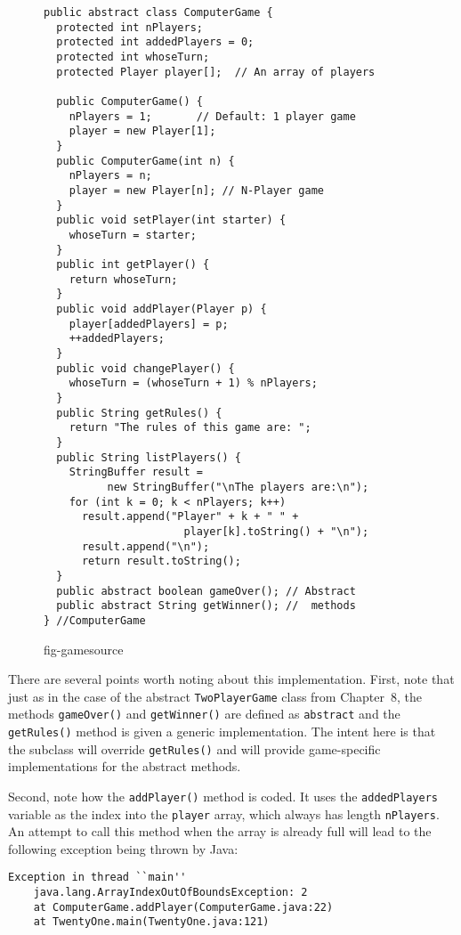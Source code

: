 \begin{figure}[h!]
\scriptsize
\jjjprogstart
\begin{jjjlisting}
\begin{lstlisting}
public abstract class ComputerGame {   
  protected int nPlayers;
  protected int addedPlayers = 0;
  protected int whoseTurn;
  protected Player player[];  // An array of players

  public ComputerGame() {
    nPlayers = 1;       // Default: 1 player game
    player = new Player[1];
  }
  public ComputerGame(int n) {
    nPlayers = n;
    player = new Player[n]; // N-Player game
  }
  public void setPlayer(int starter) { 
    whoseTurn = starter; 
  }
  public int getPlayer() { 
    return whoseTurn;  
  }
  public void addPlayer(Player p) {
    player[addedPlayers] = p;
    ++addedPlayers;
  }
  public void changePlayer() { 
    whoseTurn = (whoseTurn + 1) % nPlayers;
  }
  public String getRules() {
    return "The rules of this game are: ";
  }
  public String listPlayers() {
    StringBuffer result = 
          new StringBuffer("\nThe players are:\n");
    for (int k = 0; k < nPlayers; k++)
      result.append("Player" + k + " " + 
                      player[k].toString() + "\n");
      result.append("\n");
      return result.toString();
  }
  public abstract boolean gameOver(); // Abstract
  public abstract String getWinner(); //  methods
} //ComputerGame
\end{lstlisting}
\end{jjjlisting}
{fig-gamesource}
\end{figure}

\noindent There are several points worth noting about this
implementation. First, note that just as in the case of the abstract
{\tt TwoPlayerGame} class from Chapter~8, the methods {\tt gameOver()}
and {\tt getWinner()} are defined as {\tt abstract} and the {\tt
getRules()} method is given a generic implementation. The intent here
is that the subclass will override {\tt getRules()} and will provide
game-specific implementations for the abstract methods.

Second, note how the {\tt addPlayer()} method is coded. It uses the
{\tt addedPlayers} variable as the index into the {\tt player} array,
which always has length {\tt nPlayers}.  An attempt to call this
method when the array is already full will lead to the following
exception being thrown by Java:

\begin{jjjlisting}
\begin{lstlisting}
Exception in thread ``main'' 
    java.lang.ArrayIndexOutOfBoundsException: 2
    at ComputerGame.addPlayer(ComputerGame.java:22)
    at TwentyOne.main(TwentyOne.java:121)
\end{lstlisting}
\end{jjjlisting}

